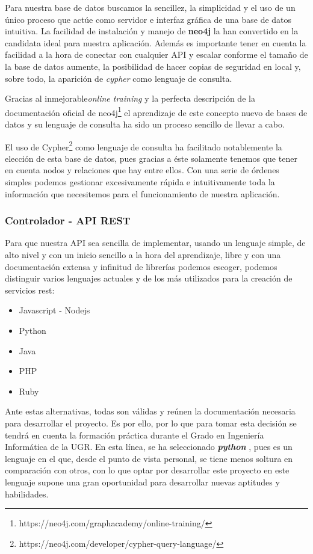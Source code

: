 Para nuestra base de datos buscamos la sencillez, la simplicidad y el uso de un único proceso que actúe como servidor e interfaz gráfica de una base de datos intuitiva. La facilidad de instalación y manejo de \textbf{neo4j} la han convertido en la candidata ideal para nuestra aplicación.  Además es importante tener en cuenta la facilidad a la hora de conectar con cualquier API y escalar conforme el tamaño de la base de datos aumente, la posibilidad de hacer copias de seguridad en local y, sobre todo, la aparición de \textit{cypher} como lenguaje de consulta\cite{neovstitan}.

Gracias al inmejorable\textit{online training} y la perfecta descripción de la documentación oficial de neo4j\footnote{https://neo4j.com/graphacademy/online-training/} el aprendizaje de este concepto nuevo de bases de datos y su lenguaje de consulta ha sido un proceso sencillo de llevar a cabo.

El uso de Cypher\footnote{https://neo4j.com/developer/cypher-query-language/} como lenguaje de consulta ha facilitado notablemente la elección de esta base de datos, pues gracias a éste solamente tenemos que tener en cuenta nodos y relaciones que hay entre ellos. Con una serie de órdenes simples podemos gestionar excesivamente rápida e intuitivamente toda la información que necesitemos para el funcionamiento de nuestra aplicación.

\subsubsection{Controlador - API REST}

Para que nuestra API sea sencilla de implementar, usando un lenguaje simple, de alto nivel y con un inicio sencillo a la hora del aprendizaje, libre y con una documentación extensa y infinitud de librerías podemos escoger, podemos distinguir varios lenguajes actuales y de los más utilizados para la creación de servicios rest\cite{apirest1}\cite{apirest2}\cite{apirest3}:

\begin{itemize}
    \item Javascript - Nodejs
    \item Python
    \item Java 
    \item PHP
    \item Ruby
\end{itemize}

Ante estas alternativas, todas son válidas y reúnen la documentación necesaria para desarrollar el proyecto. Es por ello, por lo que para tomar esta decisión se tendrá en cuenta la formación  práctica durante el Grado en Ingeniería Informática de la UGR. En esta línea, se ha seleccionado \textbf{\textit{python} }, pues es un lenguaje en el que, desde el punto de vista personal, se tiene menos soltura en comparación con otros, con lo que optar por desarrollar este proyecto en este lenguaje supone una gran oportunidad para desarrollar nuevas aptitudes y habilidades.

